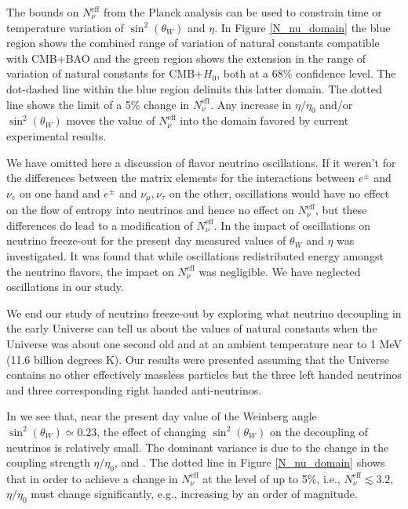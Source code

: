 The bounds on $N_\nu^{\mathrm{eff}}$ from the Planck analysis \cite{Planck:2013pxb} can be used to constrain time or temperature variation of $\sin^2(\theta_W)$ and $\eta$. 
In Figure \ref{N_nu_domain} the blue region shows the combined range of variation of natural constants compatible with CMB+BAO and the green region shows the extension in the range of variation of natural constants for CMB+$H_0$, both at a $68\%$ confidence level. The dot-dashed line within the blue region delimits this latter domain. The dotted line shows the limit of a 5\% change in $N_\nu^{\mathrm{eff}}$. Any increase in $\eta/\eta_0$ and/or $\sin^2(\theta_W)$ moves the value of $N_\nu^{\mathrm{eff}}$ into the domain favored by current experimental results.

We have omitted here a discussion of flavor neutrino oscillations. If it weren't for the differences between the matrix elements for the interactions between $e^\pm$ and $\nu_e$ on one hand and $e^\pm$ and $\nu_\mu,\nu_\tau$ on the other, oscillations would have no effect on the flow of entropy into neutrinos and hence no effect on $N_\nu^{\mathrm{eff}}$, but these differences do lead to a modification of $N_\nu^{\mathrm{eff}}$. In \cite{Mangano:2005cc} the impact of oscillations on neutrino freeze-out for the present day measured values of $\theta_W$ and $\eta$ was investigated. It was found that while oscillations redistributed energy amongst the neutrino flavors, the impact on $N_\nu^{\mathrm{eff}}$ was negligible. We have neglected oscillations in our study.

We end our study of neutrino freeze-out by exploring what neutrino decoupling in the early Universe can tell us about the values of natural constants when the Universe was about one second old and at an ambient temperature near to 1 MeV (11.6 billion degrees K). Our results were presented assuming that the Universe contains no other effectively massless particles but the three left handed neutrinos and three corresponding right handed anti-neutrinos. 

In  we see that, near the present day value of the Weinberg angle $\sin^2(\theta_W)\simeq 0.23$, the effect of changing $\sin^2(\theta_W)$ on the decoupling of neutrinos is relatively small. The dominant variance is due to the change in the coupling strength $\eta/\eta_0$,  and . The dotted line in Figure \ref{N_nu_domain} shows that in order to achieve a change in $N_\nu^{\mathrm{eff}}$ at the level of up to 5\%, i.e., $N_\nu^{\mathrm{eff}}\lesssim 3.2 $, $\eta/\eta_0$ must change significantly, e.g., increasing by an order of magnitude.

